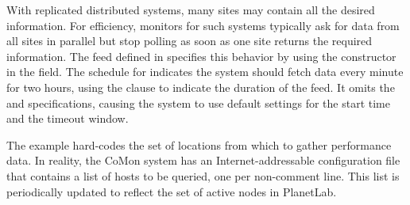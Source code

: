 With replicated distributed systems, many sites may contain all the
desired information.   
For efficiency, monitors for such
systems typically ask for data from all sites in parallel but stop 
polling as soon as one site returns the required information.  The
 feed defined in  specifies this behavior
by using the  constructor in the  field.
The schedule for  indicates the system should fetch data
every minute for two hours, using the  clause to indicate
the duration of the feed.  It omits the  and
 specifications, causing the system to use default
settings for the start time and the timeout window.  



The  example hard-codes the set of locations from
which to gather performance data.  In reality, the CoMon system has an
Internet-addressable configuration file that contains a list of hosts
to be queried, one per non-comment line. This list is periodically
updated to reflect the set of active nodes in PlanetLab. 



